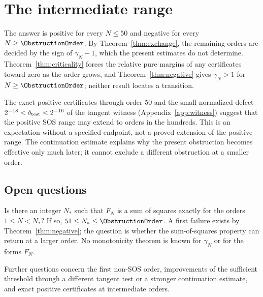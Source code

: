 \section{The intermediate range}\label{sec:discussion}
The answer is positive for every $N\le50$ and negative for every
$N\ge\ObstructionOrder$. By Theorem~\ref{thm:exchange}, the remaining
orders are decided by the sign of $\gamma_N-1$, which the present
estimates do not determine. Theorem~\ref{thm:criticality} forces the
relative pure margins of any certificates toward zero as the order
grows, and Theorem~\ref{thm:negative} gives $\gamma_N>1$ for
$N\ge\ObstructionOrder$; neither result locates a transition.

\begin{remark}\label{rem:persistence}
The exact positive certificates through order $50$ and the small
normalized defect $2^{-18}<\delta_{\rm test}<2^{-16}$ of the tangent
witness (Appendix~\ref{app:witness}) suggest that the positive SOS
range may extend to orders in the hundreds. This is an expectation
without a specified endpoint, not a proved extension of the positive
range. The continuation estimate explains why the present obstruction
becomes effective only much later; it cannot exclude a different
obstruction at a smaller order.
\end{remark}

\subsection{Open questions}\label{sec:questions}
Is there an integer $N_*$ such that $F_N$ is a sum of squares exactly
for the orders $1\le N<N_*$? If so, $51\le N_*\le\ObstructionOrder$.
A first failure exists by Theorem~\ref{thm:negative}; the question is
whether the sum-of-squares property can return at a larger order. No
monotonicity theorem is known for $\gamma_N$ or for the forms $F_N$.

Further questions concern the first non-SOS order, improvements of the
sufficient threshold through a different tangent test or a stronger
continuation estimate, and exact positive certificates at intermediate
orders.
